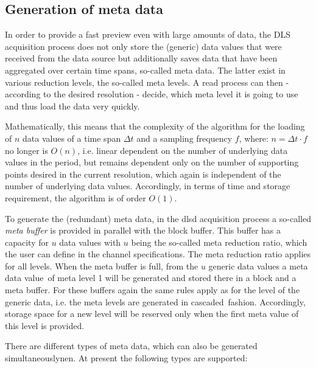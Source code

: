 \documentclass[a4paper,12pt,BCOR6mm,bibtotoc,idxtotoc]{scrbook}
\begin{document}

\subsection{Generation of meta data} \label{sec:dlsd_data_meta}

In order to provide a fast preview even with large amounts of data, the DLS acquisition process does not only store the (\glqq generic\grqq) data values that were received from the data source but additionally saves data that have been aggregated over certain time spans, so-called \glqq meta data\grqq{}. The latter exist in various reduction levels, the so-called \glqq meta levels\grqq. A read process can then - according to the desired resolution - decide, which meta level it is going to use and thus load the data very quickly.

Mathematically, this means that the complexity of the algorithm for the loading of $n$ data values of a time span $\Delta t$ and a sampling frequency $f$, where: $n = \Delta t \cdot f$ no longer is $O(n)$, i.e. linear dependent on the number of underlying data values in the period, but remains dependent only on the number of supporting points desired in the current resolution, which again is independent of the number of underlying data values. Accordingly, in terms of time and storage requirement, the algorithm is of order $O(1)$.

To generate the (redundant) meta data, in the dlsd acquisition process a so-called \textit{meta buffer} is provided in parallel with the block buffer. This buffer has a capacity for $u$ data values with $u$ being the so-called meta reduction ratio, which the user can define in the channel specifications. The meta reduction ratio applies for all levels. When the meta buffer is full, from the $u$ generic data values a \glqq meta data value\grqq\  of meta level 1 will be generated and stored there in a block and a meta buffer. For these buffers again the same rules apply as for the level of the generic data, i.e. the meta levels are generated in \glqq cascaded\grqq\  fashion. Accordingly, storage space for a new level will be reserved only when the first meta value of this level is provided.

There are different types of meta data, which can also be generated simultaneously\-nen.  At present the following types are supported:
\end{document}
